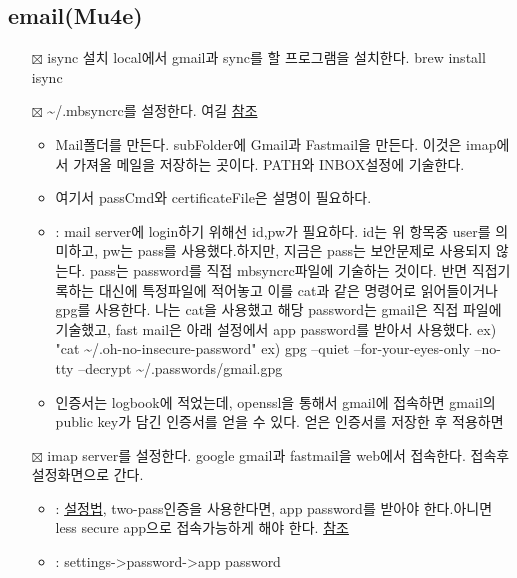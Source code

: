 \documentclass[11pt]{article}
\begin{document}
\subsection*{email(Mu4e)}
\label{sec:org62787cf}
\begin{itemize}
\item[{$\boxtimes$}] isync 설치
local에서 gmail과 sync를 할 프로그램을 설치한다. brew install isync

\item[{$\boxtimes$}] \textasciitilde{}/.mbsyncrc를 설정한다. 여길 \href{file:///Users/holy/.mbsyncrc}{참조}
\begin{itemize}
\item Mail폴더를 만든다. subFolder에 Gmail과 Fastmail을 만든다. 이것은 imap에서 가져올 메일을 저장하는 곳이다. PATH와 INBOX설정에 기술한다.
\end{itemize}
\begin{itemize}
\item 여기서 passCmd와 certificateFile은 설명이 필요하다.
\item\relax [passCmd]: mail server에 login하기 위해선 id,pw가 필요하다. id는 위 항목중 user를 의미하고, pw는 pass를 사용했다.하지만, 지금은 pass는 보안문제로 사용되지 않는다. pass는 password를 직접 mbsyncrc파일에 기술하는 것이다. 반면  직접기록하는 대신에 특정파일에 적어놓고 이를 cat과 같은 명령어로 읽어들이거나 gpg를 사용한다. 나는 cat을 사용했고 해당 password는 gmail은 직접 파일에 기술했고, fast mail은 아래 설정에서 app password를 받아서 사용했다.
ex) "cat \textasciitilde{}/.oh-no-insecure-password"
ex) gpg --quiet --for-your-eyes-only --no-tty --decrypt \textasciitilde{}/.passwords/gmail.gpg
\item 인증서는 logbook에 적었는데, openssl을 통해서 gmail에 접속하면 gmail의 public key가 담긴 인증서를 얻을 수 있다. 얻은 인증서를 저장한 후 적용하면
\end{itemize}
\end{itemize}
\begin{itemize}
\item[{$\boxtimes$}] imap server를 설정한다. 
google gmail과 fastmail을 web에서 접속한다. 접속후 설정화면으로 간다.
\begin{itemize}
\item\relax [gmail]: \href{https://support.google.com/mail/answer/7126229?hl=en}{설정법}, two-pass인증을 사용한다면, app password를 받아야 한다.아니면 less secure app으로 접속가능하게 해야 한다. \href{https://myaccount.google.com/lesssecureapps?pli=1\&rapt=AEjHL4NfiM5-El5bbUyLjtgLtJR3Q8iaaB1U3ZOSHERUwRyureo\_rGEIPZbph5C8sgVJIyt4Ag3uL8ujJdkfLEfc9Tc93oKGlw}{참조}
\item\relax [fastmail]: settings->password->app password
\end{itemize}
\end{itemize}
\end{document}
